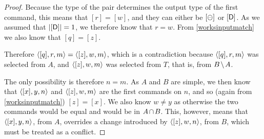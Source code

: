 \begin{proof}
Because the type of the pair determines the output type of the first command,
this means that $[r]=[w]$, and they can either be $[\ominus]$ or $[\mathsf{D}]$.
As we assumed that $|[\mathsf{D}]|=1$, we therefore know that $r=w$.
From \cref{worksinputmatch} we also know that $[q]=[z]$.

Therefore $\langle{[q],r,m}\rangle = \langle{[z],w,m}\rangle$, which is a contradiction
because $\langle{[q],r,m}\rangle$ was selected from $A$, and
$\langle{[z],w,m}\rangle$ was selected from $T$, that is, from $\bmanp$.

The only possibility is therefore $n=m$.
As $A$ and $B$ are simple, we then know that
$\langle{[x],y,n}\rangle$ and $\langle{[z],w,m}\rangle$ are the first commands on $n$,
and so (again from \cref{worksinputmatch}) $[z]=[x]$.
We also know $w\neq y$ as otherwise the two commands would be equal and
would be in $\acbnp$.
This, however, means that $\langle{[x],y,n}\rangle$, from $A$, overrides a change introduced 
by $\langle{[z],w,n}\rangle$, from $B$, which must be treated as a conflict.
\end{proof}
